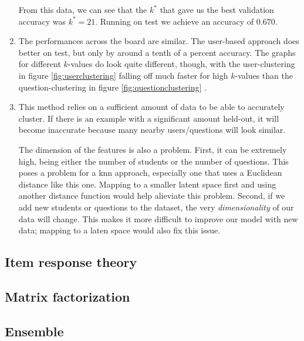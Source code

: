 \documentclass{article}
\begin{document}
\begin{multicols}{2}
\begin{enumerate}
From this data, we can see that the $k^*$ that gave us the best validation
accuracy was $k^* = 21$. Running on test we achieve an accuracy of $0.670$.

\item
The performances across the board are similar. The user-based approach does
better on test, but only by around a tenth of a percent accuracy. The graphs
for different $k$-values do look quite different, though, with the
user-clustering in figure \ref{fig:userclustering} falling off much faster for
high $k$-values than the question-clustering in figure
\ref{fig:questionclustering} .

\item

This method relies on a sufficient amount of data to be able to accurately
cluster. If there is an example with a significant amount held-out, it will
become inaccurate because many nearby users/questions will look similar.

The dimension of the features is also a problem. First, it can be extremely
high, being either the number of students or the number of questions. This
poses a problem for a {\sc knn} approach, especially one that uses a Euclidean
distance like this one. Mapping to a smaller latent space first and using
another distance function would help alieviate this problem. Second, if we add
new students or questions to the dataset, the very {\it dimensionality} of our
data will change. This makes it more difficult to improve our model with new
data; mapping to a laten space would also fix this issue.

\end{enumerate}

\subsection{Item response theory}
\blindtext

\subsection{Matrix factorization}
\blindtext

\subsection{Ensemble}
\blindtext

\section{}

\blindtext

\end{multicols}
\end{document}

